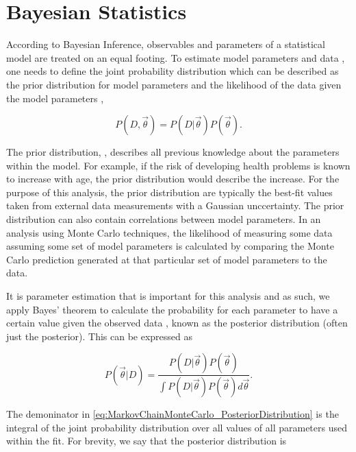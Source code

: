 \section{Bayesian Statistics}
\label{sec:MarkovChainMonteCarlo_BayesianStatistics}
According to Bayesian Inference, observables and parameters of a statistical model are treated on an equal footing. To estimate model parameters \quickmath{\vec{\theta}} and data , one needs to define the joint probability distribution  which can be described as the prior distribution for model parameters  and the likelihood of the data given the model parameters ,

\begin{equation}
  P(D,\vec{\theta}) = P(D|\vec{\theta})P(\vec{\theta}).
\end{equation}

The prior distribution, , describes all previous knowledge about the parameters within the model. For example, if the risk of developing health problems is known to increase with age, the prior distribution would describe the increase. For the purpose of this analysis, the prior distribution are typically the best-fit values taken from external data measurements with a Gaussian unccertainty. The prior distribution can also contain correlations between model parameters. In an analysis using Monte Carlo techniques, the likelihood of measuring some data assuming some set of model parameters is calculated by comparing the Monte Carlo prediction generated at that particular set of model parameters to the data.

It is parameter estimation that is important for this analysis and as such, we apply Bayes' theorem  to calculate the probability for each parameter to have a certain value given the observed data , known as the posterior distribution (often just the posterior). This can be expressed as

\begin{equation}
  \label{eq:MarkovChainMonteCarlo_PosteriorDistribution}
  P(\vec{\theta}|D) = \frac{ P(D|\vec{\theta}) P(\vec{\theta}) }{\int P(D|\vec{\theta}) P(\vec{\theta}) d\vec{\theta}}.
\end{equation}

The demoninator in \autoref{eq:MarkovChainMonteCarlo_PosteriorDistribution} is the integral of the joint probability distribution over all values of all parameters used within the fit. For brevity, we say that the posterior distribution is

